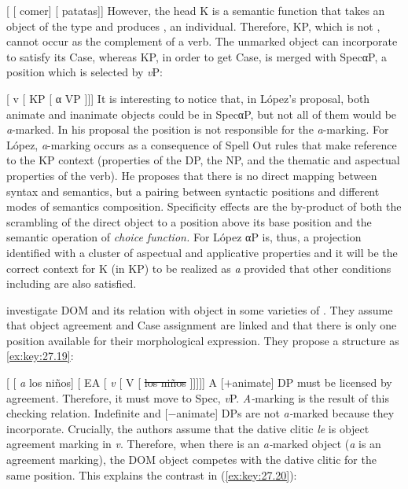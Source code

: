 \documentclass[output=paper]{langsci/langscibook}
\begin{document}
\ea\label{ex:key:27.17}
    [ [ comer] [ patatas]]
\z
However, the head K is a semantic function that takes an object of the type
 and produces , an individual. Therefore, KP, which is not ,
cannot occur as the complement of a verb. The unmarked object  can
incorporate to satisfy its Case, whereas KP, in order to get Case, is merged
with SpecαP, a position which is selected by \emph{v}P:

\ea\label{ex:key:27.18}
    {}[  v [  KP [  α  VP ]]]
\z
It is interesting to notice that, in López's proposal, both animate and
inanimate objects could be in SpecαP, but not all of them would be
\emph{a}{}-marked. In his proposal the position is not responsible for the
\emph{a}{}-marking. For López, \emph{a}{}-marking occurs as a consequence
of Spell Out rules that make reference to the KP context (properties of the DP,
the NP, and the thematic and aspectual properties of the verb). He proposes
that there is no direct mapping between syntax and semantics, but a pairing
between syntactic positions and different modes of semantics composition.
Specificity effects are the by-product of both the scrambling of the direct
object to a position above its base position and the semantic operation of
\emph{choice function.} For López αP is, thus, a projection
identified with a cluster of aspectual and applicative properties and it will
be the correct context for K (in KP) to be realized as \emph{a} provided that
other conditions including  are also satisfied.

\citet{OrmazabalRomero2013} investigate DOM and
its relation with object  in some varieties of . They assume that
object agreement and Case assignment are linked and that there is only one
position available for their morphological expression. They propose a structure
as \eqref{ex:key:27.19}:

\ea\label{ex:key:27.19}
    {}[ [ \emph{a} los niños]  [ \gls{EA}
    [ \emph{v} [  V  [ \sout{los niños} ]]]]]
\z
A [$+$animate] DP must be licensed by agreement. Therefore, it must move to
Spec, \emph{v}P. \emph{A-}marking is the result of this checking relation.
Indefinite and [$-$animate] DPs are not \emph{a-}marked because they
incorporate. Crucially, the authors assume that the dative clitic \emph{le} is
object agreement marking in \emph{v}. Therefore, when there is an
\emph{a-}marked object (\emph{a} is an agreement marking), the
DOM object competes with the dative clitic for
the same position. This explains the contrast in
(\ref{ex:key:27.20}):
\end{document}
